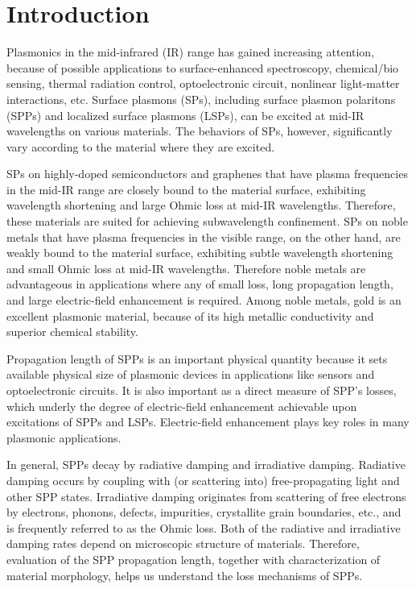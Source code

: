 \documentclass[aip,apl,reprint]{revtex4-1}
\begin{document}
\section{Introduction}
Plasmonics in the mid-infrared (IR) range has gained increasing attention,\cite{Stanley, Law} because of possible applications to surface-enhanced spectroscopy,\cite{Neubrech, Hoang} chemical/bio sensing,\cite{Cleary2008} thermal radiation control,\cite{Kusunoki} optoelectronic circuit,\cite{Ebbesen, Soref} nonlinear light-matter interactions,\cite{Kusa2015} etc. Surface plasmons (SPs), including surface plasmon polaritons (SPPs) and localized surface plasmons (LSPs), can be excited at mid-IR wavelengths on various materials.\cite{Law} The behaviors of SPs, however, significantly vary according to the material where they are excited.\cite{Law} 

SPs on highly-doped semiconductors and graphenes that have plasma frequencies in the mid-IR range are closely bound to the material surface, exhibiting wavelength shortening and large Ohmic loss at mid-IR wavelengths. Therefore, these materials are suited for achieving subwavelength confinement. SPs on noble metals that have plasma frequencies in the visible range, on the other hand, are weakly bound to the material surface, exhibiting subtle wavelength shortening and small Ohmic loss at mid-IR wavelengths. Therefore noble metals are advantageous in applications where any of small loss, long propagation length, and large electric-field enhancement is required.\cite{Law, Kusa2014}
Among noble metals, gold is an excellent plasmonic material, because of its high metallic conductivity and superior chemical stability.\cite{Zayats}

Propagation length of SPPs is an important physical quantity because it sets available physical size of plasmonic devices in applications like sensors and optoelectronic circuits. It is also important as a direct measure of SPP's losses, which underly the degree of electric-field enhancement achievable upon excitations of SPPs and LSPs. Electric-field enhancement plays key roles in many plasmonic applications.

In general, SPPs decay by radiative damping and irradiative damping. Radiative damping occurs by coupling with (or scattering into) free-propagating light and other SPP states. Irradiative damping originates from scattering of free electrons by electrons, phonons, defects, impurities, crystallite grain boundaries, etc., and is frequently referred to as the Ohmic loss. Both of the radiative and irradiative damping rates depend on microscopic structure of materials. Therefore, evaluation of the SPP propagation length, together with characterization of material morphology, helps us understand the loss mechanisms of SPPs.
\end{document}
